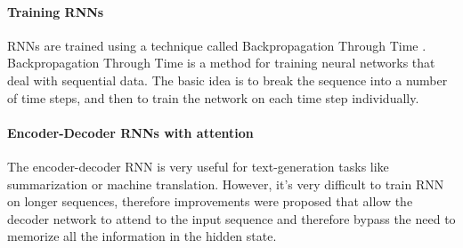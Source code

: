 \paragraph{Training RNNs}
RNNs are trained using a technique called Backpropagation Through Time \cite{werbos1990backpropagation}.
Backpropagation Through Time is a method for training neural networks that deal with sequential data.
The basic idea is to break the sequence into a number of time steps, and then to train the network on each time step individually.

\paragraph{Encoder-Decoder RNNs with attention}
The encoder-decoder RNN is very useful for text-generation tasks like summarization or machine translation.
However, it's very difficult to train RNN on longer sequences, therefore improvements were proposed \cite{bahdanau2014neural,luong-etal-2015-effective} that allow the decoder network to attend to the input sequence and therefore bypass the need to memorize all the information in the hidden state.

